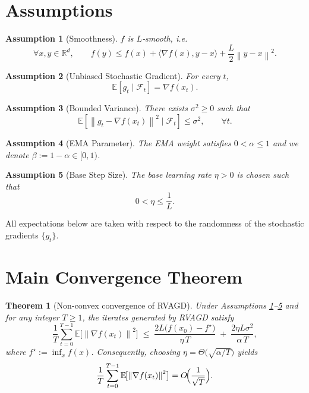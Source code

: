 \documentclass{article}
\newtheorem{theorem}{Theorem}
\newtheorem{assumption}{Assumption}
\newcommand{\E}{\mathbb{E}}
\newcommand{\norm}[1]{\left\|#1\right\|}
\begin{document}
\section*{Assumptions}
\begin{assumption}[Smoothness]\label{ass:smooth}
$f$ is $L$‑smooth, i.e.
\[
\forall x,y\in\mathbb{R}^d,\qquad 
f(y)\le f(x)+\langle\nabla f(x),y-x\rangle+\frac{L}{2}\norm{y-x}^2 .
\]
\end{assumption}
\begin{assumption}[Unbiased Stochastic Gradient]\label{ass:unbiased}
For every $t$,
\[
\E\!\left[g_t\mid\mathcal{F}_t\right]=\nabla f(x_t).
\]
\end{assumption}
\begin{assumption}[Bounded Variance]\label{ass:variance}
There exists $\sigma^2\ge0$ such that
\[
\E\!\left[\norm{g_t-\nabla f(x_t)}^2\mid\mathcal{F}_t\right]\le\sigma^2,\qquad\forall t.
\]
\end{assumption}
\begin{assumption}[EMA Parameter]\label{ass:alpha}
The EMA weight satisfies $0<\alpha\le 1$ and we denote $\beta:=1-\alpha\in[0,1)$.
\end{assumption}
\begin{assumption}[Base Step Size]\label{ass:eta}
The base learning rate $\eta>0$ is chosen such that 
\[
0<\eta\le \frac{1}{L}.
\]
\end{assumption}
All expectations below are taken with respect to the randomness of the stochastic gradients $\{g_t\}$.

\section*{Main Convergence Theorem}
\begin{theorem}[Non‑convex convergence of RVAGD]\label{thm:main}
Under Assumptions \ref{ass:smooth}–\ref{ass:eta} and for any integer $T\ge1$, the iterates generated by RVAGD satisfy
\[
\frac{1}{T}\sum_{t=0}^{T-1}\E\!\bigl[\norm{\nabla f(x_t)}^2\bigr]
\;\le\;
\frac{2L\bigl(f(x_0)-f^\star\bigr)}{\eta\,T}
\;+\;
\frac{2\eta L\sigma^2}{\alpha\,T},
\tag{5}
\]
where $f^\star:=\inf_{x}f(x)$. Consequently, choosing $\eta=\Theta\bigl(\sqrt{\alpha/T}\bigr)$ yields
\[
\frac{1}{T}\sum_{t=0}^{T-1}\E\!\bigl[\norm{\nabla f(x_t)}^2\bigr]
=O\!\Bigl(\frac{1}{\sqrt{T}}\Bigr).
\]
\end{theorem}
\end{document}
